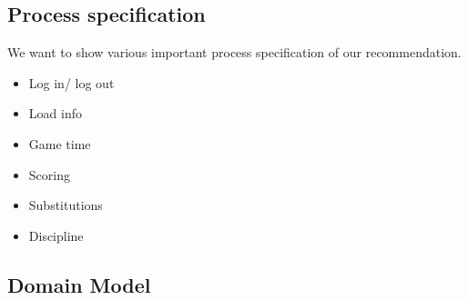 \documentclass[a4paper,12pt]{report}
\begin{document}
\subsection{Process specification}
We want to show various important process specification of our recommendation.
\begin{itemize}
	\item Log in/ log out
		\begin{center}
		\end{center}
	\item Load info
		\begin{center}
		\end{center}
	\item Game time
		\begin{center}
		\end{center}
	\item Scoring
		\begin{center}
		\end{center}
	\item Substitutions
		\begin{center}
		\end{center}
	\item Discipline
		\begin{center}
		\end{center}
\end{itemize}
\subsection{Domain Model}
	\begin{center}
	\end{center}
\newpage


{} 

\end{document}
